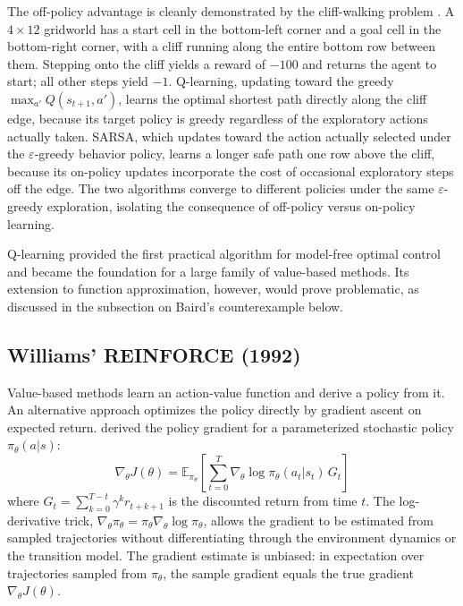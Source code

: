 The off-policy advantage is cleanly demonstrated by the cliff-walking problem \citep{sutton2018}. A $4 \times 12$ gridworld has a start cell in the bottom-left corner and a goal cell in the bottom-right corner, with a cliff running along the entire bottom row between them. Stepping onto the cliff yields a reward of $-100$ and returns the agent to start; all other steps yield $-1$. Q-learning, updating toward the greedy $\max_{a'} Q(s_{t+1}, a')$, learns the optimal shortest path directly along the cliff edge, because its target policy is greedy regardless of the exploratory actions actually taken. SARSA, which updates toward the action actually selected under the $\varepsilon$-greedy behavior policy, learns a longer safe path one row above the cliff, because its on-policy updates incorporate the cost of occasional exploratory steps off the edge. The two algorithms converge to different policies under the same $\varepsilon$-greedy exploration, isolating the consequence of off-policy versus on-policy learning.

Q-learning provided the first practical algorithm for model-free optimal control and became the foundation for a large family of value-based methods. Its extension to function approximation, however, would prove problematic, as discussed in the subsection on Baird's counterexample below.

\subsection{Williams' REINFORCE (1992)}

Value-based methods learn an action-value function and derive a policy from it. An alternative approach optimizes the policy directly by gradient ascent on expected return. \citet{williams1992} derived the policy gradient for a parameterized stochastic policy $\pi_\theta(a|s)$:
\begin{equation}
\nabla_\theta J(\theta) = \mathbb{E}_{\pi_\theta} \left[ \sum_{t=0}^{T} \nabla_\theta \log \pi_\theta(a_t|s_t) \, G_t \right]
\end{equation}
where $G_t = \sum_{k=0}^{T-t} \gamma^k r_{t+k+1}$ is the discounted return from time $t$. The log-derivative trick, $\nabla_\theta \pi_\theta = \pi_\theta \nabla_\theta \log \pi_\theta$, allows the gradient to be estimated from sampled trajectories without differentiating through the environment dynamics or the transition model. The gradient estimate is unbiased: in expectation over trajectories sampled from $\pi_\theta$, the sample gradient equals the true gradient $\nabla_\theta J(\theta)$.


